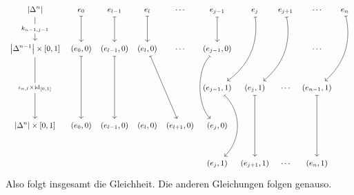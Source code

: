 	\[
		\begin{tikzcd}[row sep=2.8em, column sep=0.2em, font=\small]
			\abs*{\Delta^n} \dar["k_{n-1,j-1}" description] && e_0 \dar[mapsto] & e_{l-1} \dar[mapsto] & e_l \dar[mapsto]& \cdots 
			& e_{j-1} \dar[mapsto]& e_j \arrow[ddl,bend left,mapsto]& e_{j+1} \arrow[ddl,bend left,mapsto] & \cdots & e_n \arrow[ddl,mapsto,bend left] \\
			\abs*{\Delta^{n-1}} \times [0,1] \arrow[dd,"\iota_{n,l}\times \id_{[0,1]}" description] && (e_0,0) \arrow[dd,mapsto] & (e_{l-1},0) \arrow[dd,mapsto] 
			& (e_l,0) \arrow[ddr, mapsto] & \cdots & (e_{j-1},0) \arrow[dd, controls={+(225:1.2) and +(135:1.2)}, mapsto] &   &  & \cdots \\
			 &&&&&& (e_{j-1},1) \arrow[dd, controls={+(-45:1) and +(45:1)}, end anchor={[xshift=2ex]north}, mapsto] & (e_{j},1) \arrow[dd, mapsto] & \cdots 
			 & (e_{n-1},1) \arrow[dd,mapsto]\\
			 \abs*{\Delta^n} \times [0,1] && (e_0,0)  & (e_{l-1},0) & (e_l,0) & (e_{l+1},0) &(e_j,0) & & & \\
			 &&&&&& (e_j,1) & (e_{j+1},1) & \cdots & (e_n,1)
		\end{tikzcd}
	\]
	Also folgt insgesamt die Gleichheit. Die anderen Gleichungen folgen genauso. \bewende

